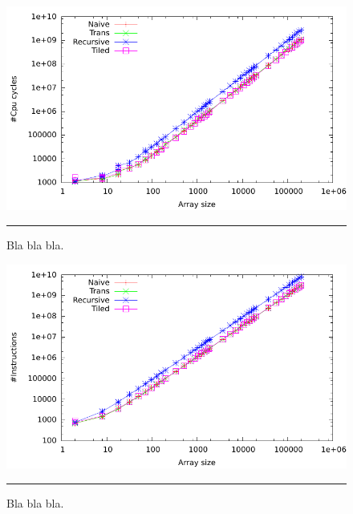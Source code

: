 \begin{figure}[htbp]
	\centering
		\includegraphics[width=\textwidth]{./Figures/Project2a/Cpu_cycles.pdf}
		\rule{35em}{0.5pt}
	\caption[CPU cycles]{
	Bla bla bla.
	}
	\label{fig:Cpu_cycles_p2a}
\end{figure}


\begin{figure}[htbp]
	\centering
		\includegraphics[width=\textwidth]{./Figures/Project2a/Instructions.pdf}
		\rule{35em}{0.5pt}
	\caption[Instructions]{
	Bla bla bla.
	}
	\label{fig:Instructions_p2a}
\end{figure}
